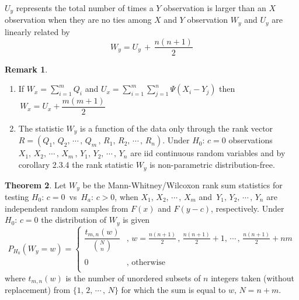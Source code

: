 \documentclass[12pt,a4paper]{report}
\theoremstyle{definition}
\newtheorem{thm}{Theorem}[section]
\newtheorem{remark}[thm]{Remark}
\theoremstyle{plain}
\begin{document}
$U_y$ represents the total number of times a $Y$ observation is larger than an $X$ observation when they are no ties among $X$ and $Y$ observation $W_y$ and $U_y$ are linearly related by 
\begin{equation}
W_y = U_y \, + \, \frac{n (n + 1)}{2}
\end{equation}




\begin{remark}
\begin{enumerate}
\item If $W_x = \sum^m_{i = 1} Q_i$ and $U_x = \sum^m_{i = 1}\sum^n_{j = 1} \Psi(X_i - Y_j)$ then $\, W_x = U_x + \dfrac{m(m + 1)}{2}$
\item The statistic $W_y$ is a function of the data only through the rank vector\\ $R = \left(Q_1, \, Q_2, \, \cdots\, , \, Q_m\, , \, R_1, \, R_2,\, \cdots\, , \, R_n\right)$. Under $H_0:\, c = 0$ observations\\ $X_1, \, X_2, \, \cdots\, , \, X_m \, , \, Y_1, \, Y_2, \, \cdots\, , \, Y_n$ are iid continuous random variables and by corollary 2.3.4 the rank statistic $W_y$ is non-parametric distribution-free.\\
\end{enumerate}
\end{remark}







\begin{thm}
Let $W_y$ be the Mann-Whitney/Wilcoxon rank sum statistics for testing $H_0:\, c = 0\, $ vs $\, H_a:\, c > 0$, when $X_1, \, X_2, \, \cdots\, , \, X_m$ and $\, Y_1, \, Y_2, \, \cdots\, , \, Y_n$ are independent random samples from $F(x)$ and $F(y - c)$, respectively. Under $H_0:\, c = 0$ the distribution of $W_y$ is given $$P_{H_0}\left(W_y = w\right) = \begin{cases}
\dfrac{t_{m,n}(w)}{\binom{N}{n}} & , \, w = \frac{n(n+1)}{2}\, , \, \frac{n(n+1)}{2} + 1,\, \cdots\,,\, \frac{n(n+1)}{2} + nm\\\\
0 & ,\,\,\text{otherwise}\\
\end{cases}$$
where $t_{m,n}(w)$ is the number of unordered subsets of $n$ integers taken (without replacement) from $\{1, \, 2, \, \cdots\, , \, N\}$ for which the sum is equal to $w, \, N = n + m$.\\
\end{thm}
\end{document}
